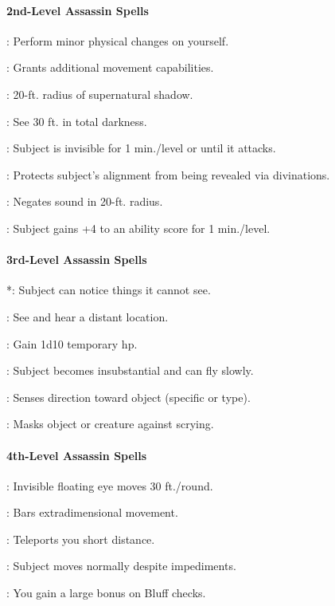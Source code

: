 \paragraph{2nd-Level Assassin Spells}
\begin{list}{}{\leftmargin=1em}
\item {}: Perform minor physical changes on yourself.
\item {}: Grants additional movement capabilities.
\item {}: 20-ft. radius of supernatural shadow.
\item {}: See 30 ft. in total darkness.
\item {}: Subject is invisible for 1 min./level or until it attacks.
\item {}: Protects subject's alignment from being revealed via divinations.
\item {}: Negates sound in 20-ft. radius.
\item {}: Subject gains +4 to an ability score for 1 min./level.
\end{list}
\paragraph{3rd-Level Assassin Spells}
\begin{list}{}{\leftmargin=1em}
\item {}*: Subject can notice things it cannot see.
\item {}: See and hear a distant location.
\item {}: Gain 1d10 temporary hp.
\item {}: Subject becomes insubstantial and can fly slowly.
\item {}: Senses direction toward object (specific or type).
\item {}: Masks object or creature against scrying.
\end{list}
\paragraph{4th-Level Assassin Spells}
\begin{list}{}{\leftmargin=1em}
\item {}: Invisible floating eye moves 30 ft./round.
\item {}: Bars extradimensional movement.
\item {}: Teleports you short distance.
\item {}: Subject moves normally despite impediments.
\item {}: You gain a large bonus on Bluff checks.
\end{list}